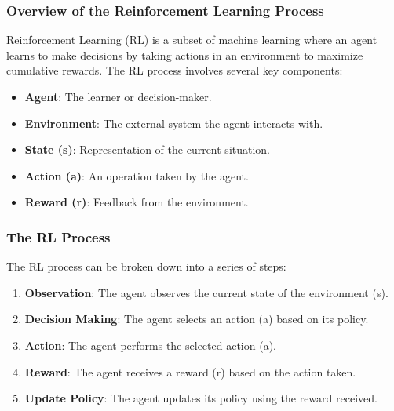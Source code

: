 \documentclass{beamer}
\begin{document}
\begin{frame}[fragile]
    \frametitle{Overview of the Reinforcement Learning Process}
    Reinforcement Learning (RL) is a subset of machine learning where an agent learns to make decisions by taking actions in an environment to maximize cumulative rewards. The RL process involves several key components:
    
    \begin{itemize}
        \item \textbf{Agent}: The learner or decision-maker.
        \item \textbf{Environment}: The external system the agent interacts with.
        \item \textbf{State (s)}: Representation of the current situation.
        \item \textbf{Action (a)}: An operation taken by the agent.
        \item \textbf{Reward (r)}: Feedback from the environment.
    \end{itemize}
\end{frame}

\begin{frame}[fragile]
    \frametitle{The RL Process}
    The RL process can be broken down into a series of steps:
    
    \begin{enumerate}
        \item \textbf{Observation}: The agent observes the current state of the environment (s).
        \item \textbf{Decision Making}: The agent selects an action (a) based on its policy.
        \item \textbf{Action}: The agent performs the selected action (a).
        \item \textbf{Reward}: The agent receives a reward (r) based on the action taken.
        \item \textbf{Update Policy}: The agent updates its policy using the reward received.
    \end{enumerate}
\end{frame}
\end{document}
